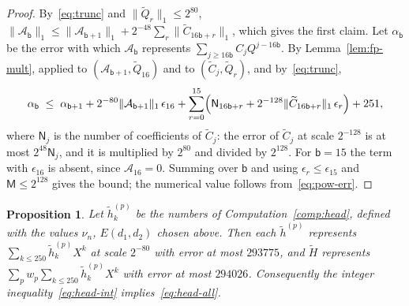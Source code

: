 \documentclass[11pt,reqno]{amsart}
\newtheorem{proposition}[theorem]{Proposition}
\theoremstyle{definition}
\numberwithin{equation}{section}
\newcommand{\lone}[1]{\|#1\|_1}
\begin{document}
\begin{proof}
By~\eqref{eq:trunc} and $\lone{\widetilde Q_r}\le2^{80}$, $\lone{\mathcal{A}_{\mathsf{b}}}\le\lone{\mathcal{A}_{\mathsf{b}+1}}+2^{-48}\sum_{r}\lone{\widetilde C_{16\mathsf{b}+r}}$, which gives the first claim. Let $\alpha_{\mathsf{b}}$ be the error with which $\mathcal{A}_{\mathsf{b}}$ represents $\sum_{j\ge16\mathsf{b}}C_jQ^{j-16\mathsf{b}}$. By Lemma~\ref{lem:fp-mult}, applied to $(\mathcal{A}_{\mathsf{b}+1},\widetilde Q_{16})$ and to $(\widetilde C_j,\widetilde Q_r)$, and by~\eqref{eq:trunc},
\[
  \alpha_{\mathsf{b}}\;\le\;\alpha_{\mathsf{b}+1}+2^{-80}\lone{\mathcal{A}_{\mathsf{b}+1}}\,\epsilon_{16}+\sum_{r=0}^{15}\Bigl(\mathsf{N}_{16\mathsf{b}+r}+2^{-128}\lone{\widetilde C_{16\mathsf{b}+r}}\,\epsilon_r\Bigr)+251 ,
\]
where $\mathsf{N}_j$ is the number of coefficients of $\widetilde C_j$: the error of $\widetilde C_j$ at scale $2^{-128}$ is at most $2^{48}\mathsf{N}_j$, and it is multiplied by $2^{80}$ and divided by $2^{128}$. For $\mathsf{b}=15$ the term with $\epsilon_{16}$ is absent, since $\mathcal{A}_{16}=0$. Summing over $\mathsf{b}$ and using $\epsilon_r\le\epsilon_{15}$ and $\mathsf{M}\le2^{128}$ gives the bound; the numerical value follows from~\eqref{eq:pow-err}.
\end{proof}

\begin{proposition}\label{prop:head-sound}
Let $\tilde h^{(p)}_k$ be the numbers of Computation~\ref{comp:head}, defined with the values $\nu_n$, $E(d_1,d_2)$ chosen above. Then each $\widetilde h^{(p)}$ represents $\sum_{k\le250}\tilde h^{(p)}_kX^k$ at scale $2^{-80}$ with error at most $293775$, and $\widetilde H$ represents $\sum_pw_p\sum_{k\le250}\tilde h^{(p)}_kX^k$ with error at most $294026$. Consequently the integer inequality~\eqref{eq:head-int} implies~\eqref{eq:head-all}.
\end{proposition}
\end{document}
